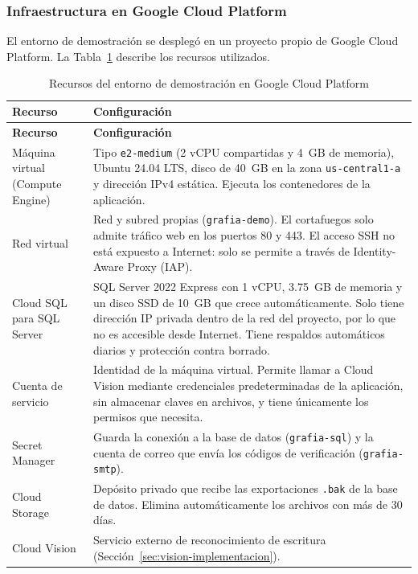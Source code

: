 \subsubsection{Infraestructura en Google Cloud Platform}

El entorno de demostración se desplegó en un proyecto propio de Google Cloud Platform. La Tabla~\ref{tab:recursos_gcp} describe los recursos utilizados.

\begin{longtable}{|p{3.4cm}|p{10.2cm}|}
\caption{Recursos del entorno de demostración en Google Cloud Platform}
\label{tab:recursos_gcp} \\

\hline
\textbf{Recurso} & \textbf{Configuración} \\
\hline
\endfirsthead

\hline
\textbf{Recurso} & \textbf{Configuración} \\
\hline
\endhead

Máquina virtual (Compute Engine) & Tipo \texttt{e2-medium} (2 vCPU compartidas y 4~GB de memoria), Ubuntu 24.04 LTS, disco de 40~GB en la zona \texttt{us-central1-a} y dirección IPv4 estática. Ejecuta los contenedores de la aplicación. \\
\hline
Red virtual & Red y subred propias (\texttt{grafia-demo}). El cortafuegos solo admite tráfico web en los puertos 80 y 443. El acceso SSH no está expuesto a Internet: solo se permite a través de Identity-Aware Proxy (IAP). \\
\hline
Cloud SQL para SQL Server & SQL Server 2022 Express con 1 vCPU, 3.75~GB de memoria y un disco SSD de 10~GB que crece automáticamente. Solo tiene dirección IP privada dentro de la red del proyecto, por lo que no es accesible desde Internet. Tiene respaldos automáticos diarios y protección contra borrado. \\
\hline
Cuenta de servicio & Identidad de la máquina virtual. Permite llamar a Cloud Vision mediante credenciales predeterminadas de la aplicación, sin almacenar claves en archivos, y tiene únicamente los permisos que necesita. \\
\hline
Secret Manager & Guarda la conexión a la base de datos (\texttt{grafia-sql}) y la cuenta de correo que envía los códigos de verificación (\texttt{grafia-smtp}). \\
\hline
Cloud Storage & Depósito privado que recibe las exportaciones \texttt{.bak} de la base de datos. Elimina automáticamente los archivos con más de 30 días. \\
\hline
Cloud Vision & Servicio externo de reconocimiento de escritura (Sección~\ref{sec:vision-implementacion}). \\
\hline

\end{longtable}

